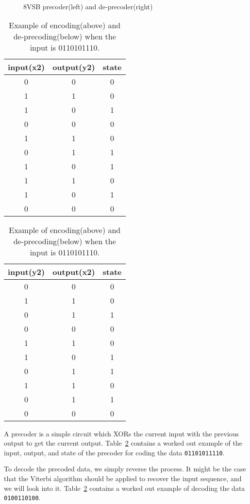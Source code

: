 \begin{figure}
\center
\epsfxsize=2.5in
\epsfxsize=2.5in
\caption{8VSB precoder(left) and de-precoder(right)}
\label{fig:precoder-deprecoder}
\end{figure}

\begin{table}
\center
\begin{tabular}{c|c|c}
input(x2) & output(y2) & state  \\
\hline
0 & 0 & 0 \\
1 & 1 & 0 \\
1 & 0 & 1 \\
0 & 0 & 0 \\
1 & 1 & 0 \\
0 & 1 & 1 \\
1 & 0 & 1 \\
1 & 1 & 0 \\
1 & 0 & 1 \\
0 & 0 & 0 \\
\end{tabular}

\begin{tabular}{c|c|c}
input(y2) & output(x2) & state  \\
\hline
0 & 0 & 0 \\
1 & 1 & 0 \\
0 & 1 & 1 \\
0 & 0 & 0 \\
1 & 1 & 0 \\
1 & 0 & 1 \\
0 & 1 & 1 \\
1 & 1 & 0 \\
0 & 1 & 1 \\
0 & 0 & 0 \\
\end{tabular}
\caption{Example of encoding(above) and de-precoding(below) when the input is 0110101110.}
\label{tbl:precoding_example}
\end{table}

A precoder is a simple circuit which XORs the current input with the previous
output to get the current output. Table~\ref{tbl:precoding_example} 
contains a worked out example of the input, output, and state of the precoder
for coding the data \texttt{01101011110}.

\begin{table}
\center
\end{table}

To decode the precoded data, we simply reverse the process. It might be the case that 
the Viterbi algorithm should be applied to recover the input sequence, and we will
look into it. Table~\ref{tbl:precoding_example} contains a worked out example of
decoding the data \texttt{0100110100}.
